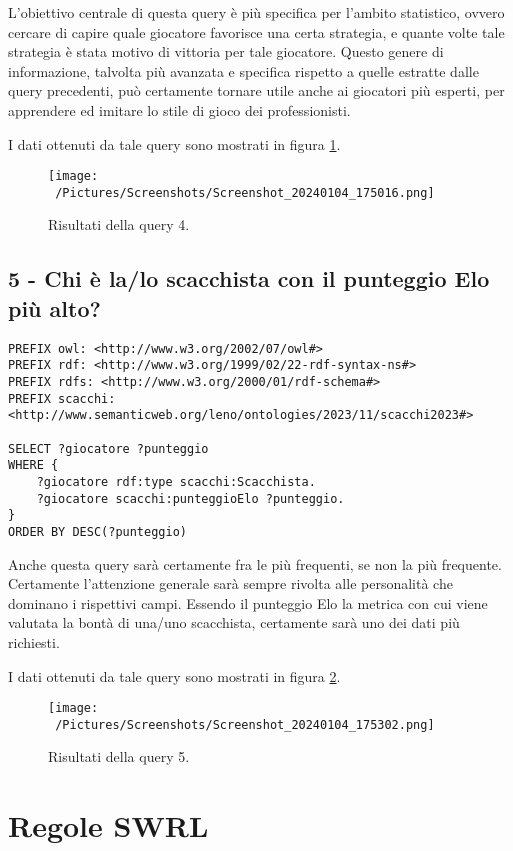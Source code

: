 \documentclass[12pt]{book}
\begin{document}
L'obiettivo centrale di questa query è più specifica per l'ambito
statistico, ovvero cercare di capire quale giocatore favorisce una
certa strategia, e quante volte tale strategia è stata motivo di
vittoria per tale giocatore. Questo genere di informazione, talvolta
più avanzata e specifica rispetto a quelle estratte dalle query
precedenti, può certamente tornare utile anche ai giocatori più
esperti, per apprendere ed imitare lo stile di gioco dei
professionisti.

I dati ottenuti da tale query sono mostrati in figura \ref{fig:query4}.

\begin{figure}[h]
  \caption{Risultati della query 4.}
  \centering
  \label{fig:query4}
  \texttt{[image: ~/Pictures/Screenshots/Screenshot\_20240104\_175016.png]}
\end{figure} 

\section{5 - Chi è la/lo scacchista con il punteggio Elo più alto?}

\begin{verbatim}
PREFIX owl: <http://www.w3.org/2002/07/owl#>
PREFIX rdf: <http://www.w3.org/1999/02/22-rdf-syntax-ns#>
PREFIX rdfs: <http://www.w3.org/2000/01/rdf-schema#>
PREFIX scacchi: <http://www.semanticweb.org/leno/ontologies/2023/11/scacchi2023#>

SELECT ?giocatore ?punteggio
WHERE {
    ?giocatore rdf:type scacchi:Scacchista.
    ?giocatore scacchi:punteggioElo ?punteggio.
}
ORDER BY DESC(?punteggio)
\end{verbatim}

Anche questa query sarà certamente fra le più frequenti, se non la più
frequente. Certamente l'attenzione generale sarà sempre rivolta alle
personalità che dominano i rispettivi campi. Essendo il punteggio Elo
la metrica con cui viene valutata la bontà di una/uno scacchista,
certamente sarà uno dei dati più richiesti.

I dati ottenuti da tale query sono mostrati in figura \ref{fig:query5}.

\begin{figure}[h]
  \caption{Risultati della query 5.}
  \centering
  \label{fig:query5}
  \texttt{[image: ~/Pictures/Screenshots/Screenshot\_20240104\_175302.png]}
\end{figure} 


\chapter{Regole SWRL}
\end{document}
